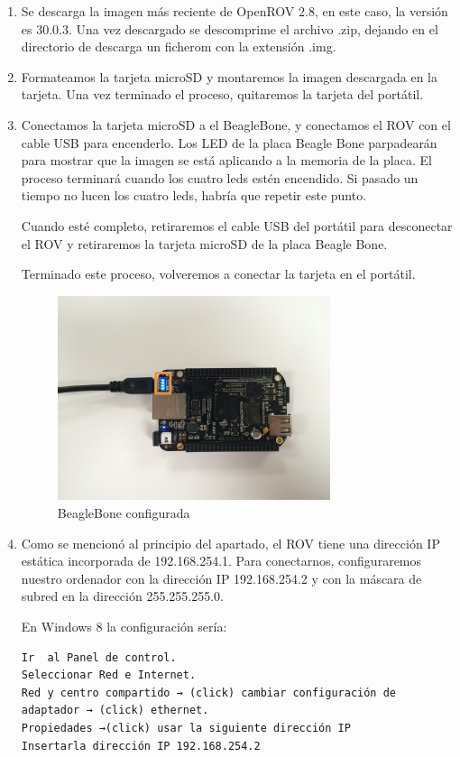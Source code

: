 \begin{enumerate}
\item Se descarga la imagen más reciente de OpenROV 2.8, en este caso, la versión es 30.0.3. Una vez descargado se descomprime el archivo .zip, dejando en el directorio de descarga un ficherom con la extensión .img.
\item Formateamos la tarjeta microSD y montaremos la imagen descargada en la tarjeta. Una vez terminado el proceso, quitaremos la tarjeta del portátil.
\item Conectamos la tarjeta microSD a el BeagleBone, y conectamos el ROV con el cable USB para encenderlo. Los LED de la placa Beagle Bone parpadearán para mostrar que la imagen se está aplicando a la memoria de la placa. El proceso terminará cuando los cuatro leds estén encendido.
Si pasado un tiempo no lucen los cuatro leds, habría que repetir este punto.

Cuando esté completo, retiraremos el cable USB del portátil para desconectar el ROV y retiraremos la tarjeta microSD de la placa Beagle Bone.

Terminado este proceso, volveremos a conectar la tarjeta en el portátil.
\newpage
\begin{figure} [hbtp]
\begin{center}
  \includegraphics[width=8cm]{img/cap3/3_4/BBB}
\end{center}
\caption{BeagleBone configurada}
\label{fig:bbb}
\end{figure}
\item Como se mencionó al principio del apartado, el ROV tiene una dirección IP estática incorporada de 192.168.254.1. Para conectarnos, configuraremos nuestro ordenador con la dirección IP 192.168.254.2 y con la máscara de subred en la dirección 255.255.255.0.

En Windows 8 la configuración sería:

\renewcommand{\lstlistingname}{Configuración}
\begin{lstlisting}[caption= Windows 8, label={lst:config_w8}]
Ir  al Panel de control.
Seleccionar Red e Internet.
Red y centro compartido → (click) cambiar configuración de adaptador → (click) ethernet.
Propiedades →(click) usar la siguiente dirección IP
Insertarla dirección IP 192.168.254.2
\end{lstlisting}


\end{enumerate}
